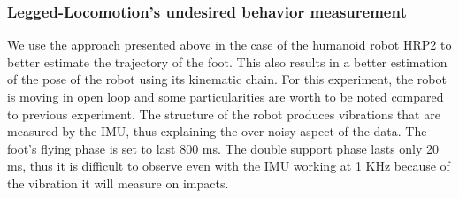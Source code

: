 
\subsubsection{Legged-Locomotion's undesired behavior measurement}

We use the approach presented above in the case of the humanoid robot HRP2 to better estimate the trajectory of the foot. This also results in a better estimation of the pose of the robot using its kinematic chain. 
For this experiment, the robot is moving in open loop and some particularities are worth to be noted compared to previous experiment. 
The structure of the robot produces vibrations that are measured by the IMU, thus explaining the over noisy aspect of the data. The foot's flying phase is set to last 800 ms. The double support phase lasts only 20 ms, thus it is difficult to observe
even with the IMU working at 1 KHz because of the vibration it will measure on impacts.






